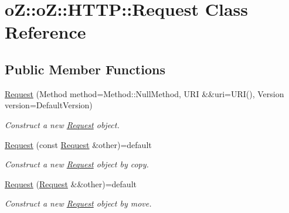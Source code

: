 \hypertarget{classo_z_1_1o_z_1_1_h_t_t_p_1_1_request}{}\section{oZ\+::oZ\+::H\+T\+TP\+::Request Class Reference}
\label{classo_z_1_1o_z_1_1_h_t_t_p_1_1_request}
\subsection*{Public Member Functions}
\begin{DoxyCompactItemize}
\item 
\mbox{\label{classo_z_1_1o_z_1_1_h_t_t_p_1_1_request_ac0740316198c643722554b1b25b1de9c}} 
\mbox{\hyperlink{classo_z_1_1o_z_1_1_h_t_t_p_1_1_request_ac0740316198c643722554b1b25b1de9c}{Request}} (Method method=Method\+::\+Null\+Method, U\+RI \&\&uri=U\+RI(), Version version=Default\+Version)
\begin{DoxyCompactList}\small\item\em Construct a new \mbox{\hyperlink{classo_z_1_1o_z_1_1_h_t_t_p_1_1_request}{Request}} object. \end{DoxyCompactList}\item 
\mbox{\label{classo_z_1_1o_z_1_1_h_t_t_p_1_1_request_a0200643038d42ef71b06579ce9423e7f}} 
\mbox{\hyperlink{classo_z_1_1o_z_1_1_h_t_t_p_1_1_request_a0200643038d42ef71b06579ce9423e7f}{Request}} (const \mbox{\hyperlink{classo_z_1_1o_z_1_1_h_t_t_p_1_1_request}{Request}} \&other)=default
\begin{DoxyCompactList}\small\item\em Construct a new \mbox{\hyperlink{classo_z_1_1o_z_1_1_h_t_t_p_1_1_request}{Request}} object by copy. \end{DoxyCompactList}\item 
\mbox{\label{classo_z_1_1o_z_1_1_h_t_t_p_1_1_request_a37b5a62d0ae99aba94b2fc18ad8ef886}} 
\mbox{\hyperlink{classo_z_1_1o_z_1_1_h_t_t_p_1_1_request_a37b5a62d0ae99aba94b2fc18ad8ef886}{Request}} (\mbox{\hyperlink{classo_z_1_1o_z_1_1_h_t_t_p_1_1_request}{Request}} \&\&other)=default
\begin{DoxyCompactList}\small\item\em Construct a new \mbox{\hyperlink{classo_z_1_1o_z_1_1_h_t_t_p_1_1_request}{Request}} object by move. \end{DoxyCompactList}\item 

\end{DoxyCompactItemize}
